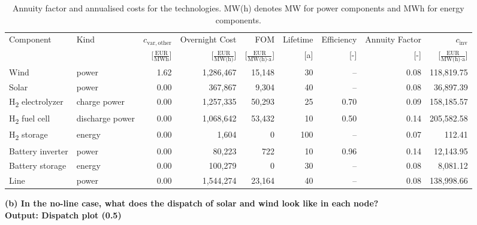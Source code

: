 \begin{table}[ht]
    \centering
    \small
    \setlength{\tabcolsep}{4pt}
    \begin{tabularx}{\textwidth}{l l r r r r r r r}
        \toprule
        Component   & Kind  & $c_{\mathrm{var,other}}$     & Overnight Cost   & FOM    & Lifetime      & Efficiency  & Annuity Factor & $c_{\mathrm{inv}}$ \\
                    &       & [$\frac{\text{EUR}}{\text{MWh}}$] & [$\frac{\text{EUR}}{\text{MW(h)}}$] & [$\frac{\text{EUR}}{\text{MW(h)}\cdot\text{a}}$] & [a] & [-] & [-] & [$\frac{\text{EUR}}{\text{MW(h)}\cdot\text{a}}$] \\
        \midrule
        Wind                            & power            & 1.62 & 1,286,467 & 15,148 & 30     & --   & 0.08 & 118,819.75  \\
        Solar                           & power            & 0.00 & 367,867   & 9,304  & 40     & --   & 0.08 & 36,897.39   \\
        H\textsubscript{2} electrolyzer & charge power     & 0.00 & 1,257,335 & 50,293 & 25     & 0.70 & 0.09 & 158,185.57  \\
        H\textsubscript{2} fuel cell    & discharge power  & 0.00 & 1,068,642 & 53,432 & 10     & 0.50 & 0.14 & 205,582.58  \\
        H\textsubscript{2} storage      & energy           & 0.00 & 1,604     & 0      & 100    & --   & 0.07 & 112.41      \\
        Battery inverter                & power            & 0.00 & 80,223    & 722    & 10     & 0.96 & 0.14 & 12,143.95   \\
        Battery storage                 & energy           & 0.00 & 100,279   & 0      & 30     & --   & 0.08 & 8,081.12    \\
        Line                            & power            & 0.00 & 1,544,274 & 23,164 & 40     & --   & 0.08 & 138,998.66  \\
        \bottomrule
    \end{tabularx}
    \caption{Annuity factor and annualised costs for the technologies. MW(h) denotes MW for power components and MWh for energy components.}
    \label{tab:tech_parameters}
\end{table}

\textbf{
    (b) In the no-line case, what does the dispatch of solar and wind look like in each node? \\
    Output: Dispatch plot (0.5)
    }

